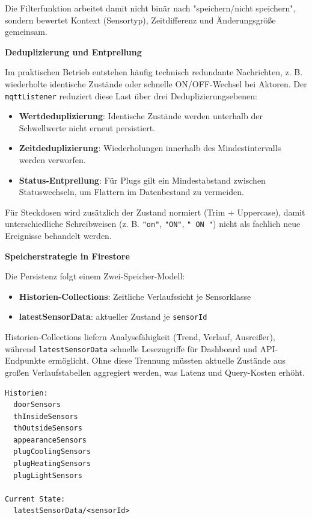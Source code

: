 Die Filterfunktion arbeitet damit nicht binär nach "speichern/nicht speichern", sondern bewertet Kontext (Sensortyp), Zeitdifferenz und Änderungsgröße gemeinsam.

\textbf{Deduplizierung und Entprellung}

Im praktischen Betrieb entstehen häufig technisch redundante Nachrichten, z. B. wiederholte identische Zustände oder schnelle ON/OFF-Wechsel bei Aktoren. Der \texttt{mqttListener} reduziert diese Last über drei Deduplizierungsebenen:

\begin{itemize}
    \item \textbf{Wertdeduplizierung}: Identische Zustände werden unterhalb der Schwellwerte nicht erneut persistiert.
    \item \textbf{Zeitdeduplizierung}: Wiederholungen innerhalb des Mindestintervalls werden verworfen.
    \item \textbf{Status-Entprellung}: Für Plugs gilt ein Mindestabstand zwischen Statuswechseln, um Flattern im Datenbestand zu vermeiden.
\end{itemize}

Für Steckdosen wird zusätzlich der Zustand normiert (Trim + Uppercase), damit unterschiedliche Schreibweisen (z. B. \texttt{"on"}, \texttt{"ON"}, \texttt{" ON "}) nicht als fachlich neue Ereignisse behandelt werden.

\textbf{Speicherstrategie in Firestore}

Die Persistenz folgt einem Zwei-Speicher-Modell:

\begin{itemize}
    \item \textbf{Historien-Collections}: Zeitliche Verlaufssicht je Sensorklasse
    \item \textbf{latestSensorData}: aktueller Zustand je \texttt{sensorId}
\end{itemize}

Historien-Collections liefern Analysefähigkeit (Trend, Verlauf, Ausreißer), während \texttt{latestSensorData} schnelle Lesezugriffe für Dashboard und API-Endpunkte ermöglicht. Ohne diese Trennung müssten aktuelle Zustände aus großen Verlaufstabellen aggregiert werden, was Latenz und Query-Kosten erhöht.

\begin{lstlisting}[caption={Collection-Modell des mqttListener},label={lst:mqttlistener_collections},basicstyle=\ttfamily\small]
Historien:
  doorSensors
  thInsideSensors
  thOutsideSensors
  appearanceSensors
  plugCoolingSensors
  plugHeatingSensors
  plugLightSensors

Current State:
  latestSensorData/<sensorId>
\end{lstlisting}

